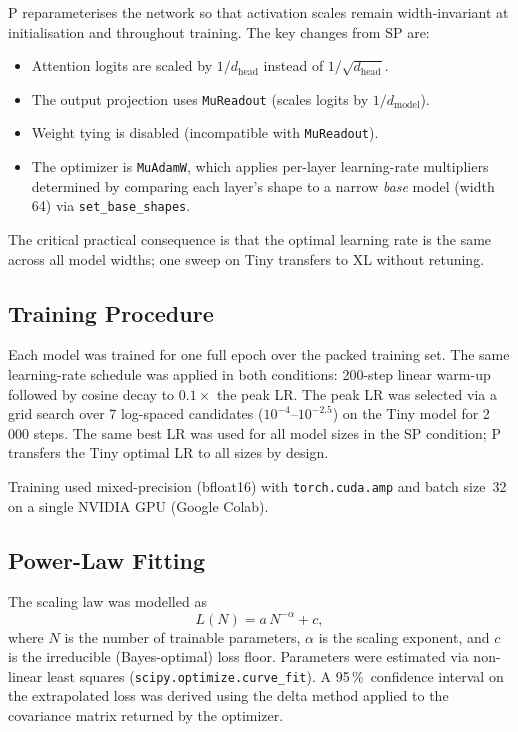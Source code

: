 \documentclass[11pt,a4paper]{article}
\begin{document}
\textmu P \citep{yang2022mup} reparameterises the network so that activation scales
remain width-invariant at initialisation and throughout training.  The key changes from
SP are:
\begin{itemize}
  \item Attention logits are scaled by $1/d_\text{head}$ instead of
        $1/\sqrt{d_\text{head}}$.
  \item The output projection uses \texttt{MuReadout} (scales logits by $1/d_\text{model}$).
  \item Weight tying is disabled (incompatible with \texttt{MuReadout}).
  \item The optimizer is \texttt{MuAdamW}, which applies per-layer learning-rate
        multipliers determined by comparing each layer's shape to a narrow \emph{base}
        model (width 64) via \texttt{set\_base\_shapes}.
\end{itemize}

The critical practical consequence is that the optimal learning rate is the same across
all model widths; one sweep on Tiny transfers to XL without retuning.

\subsection{Training Procedure}

Each model was trained for one full epoch over the packed training set.  The same
learning-rate schedule was applied in both conditions: 200-step linear warm-up followed
by cosine decay to $0.1\times$ the peak LR.  The peak LR was selected via a grid search
over 7 log-spaced candidates ($10^{-4}$--$10^{-2.5}$) on the Tiny model for 2\,000 steps.
The same best LR was used for all model sizes in the SP condition; \textmu P transfers
the Tiny optimal LR to all sizes by design.

Training used mixed-precision (bfloat16) with \texttt{torch.cuda.amp} and batch size~32
on a single NVIDIA GPU (Google Colab).

\subsection{Power-Law Fitting}

The scaling law was modelled as
\begin{equation}
  L(N) = a\,N^{-\alpha} + c,
  \label{eq:powerlaw}
\end{equation}
where $N$ is the number of trainable parameters, $\alpha$ is the scaling exponent,
and $c$ is the irreducible (Bayes-optimal) loss floor.  Parameters were estimated via
non-linear least squares (\texttt{scipy.optimize.curve\_fit}).  A 95\,\%~confidence
interval on the extrapolated loss was derived using the delta method applied to the
covariance matrix returned by the optimizer.
\end{document}
